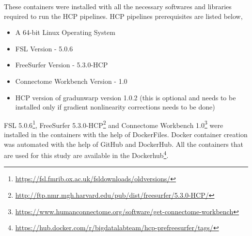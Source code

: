 These containers were installed with all the necessary softwares and libraries required to run the HCP pipelines. HCP pipelines prerequisites are listed below,

\begin{itemize}
\item A 64-bit Linux Operating System
\item FSL Version - 5.0.6
\item FreeSurfer Version - 5.3.0-HCP
\item Connectome Workbench Version - 1.0
\item HCP version of gradunwarp version 1.0.2 (this is optional and needs to be installed only if gradient nonlinearity corrections needs to be done)
\end{itemize}

FSL 5.0.6\footnote{\url{https://fsl.fmrib.ox.ac.uk/fsldownloads/oldversions/}}, FreeSurfer 5.3.0-HCP\footnote{\url{http://ftp.nmr.mgh.harvard.edu/pub/dist/freesurfer/5.3.0-HCP/}} and Connectome Workbench 1.0\footnote{\url{https://www.humanconnectome.org/software/get-connectome-workbench}} were installed in the containers with the help of DockerFiles.
Docker container creation was automated with the help of GitHub and DockerHub. All the containers that are used for this study are available in the Dockerhub\footnote{\url{https://hub.docker.com/r/bigdatalabteam/hcp-prefreesurfer/tags/}}.

